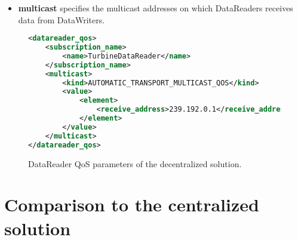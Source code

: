 \begin{itemize}
	\item \textbf{multicast} specifies the multicast addresses on which DataReaders receives data from DataWriters. 
\end{itemize}

\begin{figure}[!h]
\begin{lstlisting}[language=XML]
<datareader_qos>
	<subscription_name>
		<name>TurbineDataReader</name>
	</subscription_name>
	<multicast>
		<kind>AUTOMATIC_TRANSPORT_MULTICAST_QOS</kind>
		<value>
			<element>
				<receive_address>239.192.0.1</receive_address>
			</element>
		</value>
	</multicast>
</datareader_qos>
\end{lstlisting}
\caption[Decentralized DataReader QoS parameters]{
		\label{fig:decDataReaderQos} 
		\footnotesize{DataReader QoS parameters of the decentralized solution.}
	}
\end{figure}

\section{Comparison to the centralized solution}